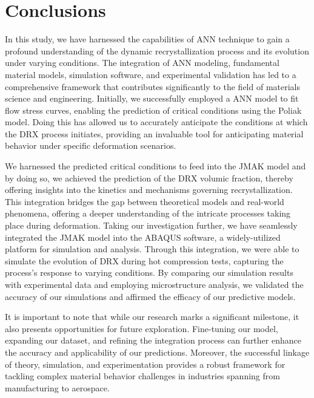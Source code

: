\documentclass[metals,article,submit,pdftex,moreauthors]{Definitions/mdpi}
\begin{document}
\section{Conclusions\label{sec:Conclusions}}
In this study, we have harnessed the capabilities of ANN technique to gain a profound understanding of the dynamic recrystallization process and its evolution under varying conditions.
The integration of ANN modeling, fundamental material models, simulation software, and experimental validation has led to a comprehensive framework that contributes significantly to the field of materials science and engineering.
Initially, we successfully employed a ANN model to fit flow stress curves, enabling the prediction of critical conditions using the Poliak model.
Doing this has allowed us to accurately anticipate the conditions at which the DRX process initiates, providing an invaluable tool for anticipating material behavior under specific deformation scenarios.

We harnessed the predicted critical conditions to feed into the JMAK model and by doing so, we achieved the prediction of the DRX volumic fraction, thereby offering insights into the kinetics and mechanisms governing recrystallization.
This integration bridges the gap between theoretical models and real-world phenomena, offering a deeper understanding of the intricate processes taking place during deformation.
Taking our investigation further, we have seamlessly integrated the JMAK model into the ABAQUS software, a widely-utilized platform for simulation and analysis.
Through this integration, we were able to simulate the evolution of DRX during hot compression tests, capturing the process's response to varying conditions.
By comparing our simulation results with experimental data and employing microstructure analysis, we validated the accuracy of our simulations and affirmed the efficacy of our predictive models.

It is important to note that while our research marks a significant milestone, it also presents opportunities for future exploration.
Fine-tuning our model, expanding our dataset, and refining the integration process can further enhance the accuracy and applicability of our predictions.
Moreover, the successful linkage of theory, simulation, and experimentation provides a robust framework for tackling complex material behavior challenges in industries spanning from manufacturing to aerospace.
\end{document}
